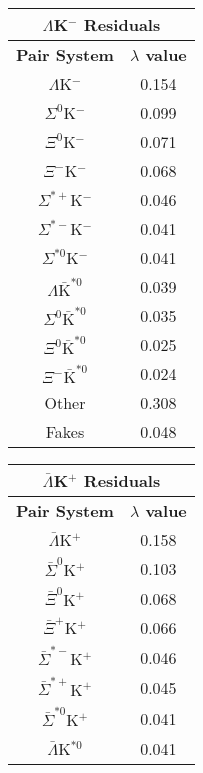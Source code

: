 \documentclass[ALICE,manyauthors]{cernphprep}
\begin{document}
\begin{table}[htbp]
 \centering
 \begin{minipage}{0.3\textwidth}
  \centering 
  \begin{tabular}{|c|c|}
   \multicolumn{2}{c}{$\Lambda$K$^{-}$ Residuals} \\
   \hline
   \textbf{Pair System} & \textbf{$\lambda$ value} \\
   \hline
   $\Lambda$K$^{-}$ & 0.154 \\
   $\Sigma^{0}$K$^{-}$ & 0.099 \\
   $\Xi^{0}$K$^{-}$ & 0.071 \\
   $\Xi^{-}$K$^{-}$ & 0.068 \\
   $\Sigma^{*+}$K$^{-}$ & 0.046 \\
   $\Sigma^{*-}$K$^{-}$ & 0.041 \\
   $\Sigma^{*0}$K$^{-}$ & 0.041 \\
   $\Lambda\bar{\mathrm{K}}^{*0}$ & 0.039 \\
   $\Sigma^{0}\bar{\mathrm{K}}^{*0}$ & 0.035 \\
   $\Xi^{0}\bar{\mathrm{K}}^{*0}$ & 0.025 \\
   $\Xi^{-}\bar{\mathrm{K}}^{*0}$ & 0.024 \\
   Other & 0.308 \\
   Fakes & 0.048 \\
   \hline
  \end{tabular}
 \end{minipage} 
 \begin{minipage}{0.3\textwidth}
  \centering 
  \begin{tabular}{|c|c|}
   \multicolumn{2}{c}{$\bar{\Lambda}$K$^{+}$ Residuals} \\
   \hline
   \textbf{Pair System} & \textbf{$\lambda$ value} \\
   \hline
   $\bar{\Lambda}$K$^{+}$ & 0.158 \\
   $\bar{\Sigma}^{0}$K$^{+}$ & 0.103 \\
   $\bar{\Xi}^{0}$K$^{+}$ & 0.068 \\
   $\bar{\Xi}^{+}$K$^{+}$ & 0.066 \\
   $\bar{\Sigma}^{*-}$K$^{+}$ & 0.046 \\
   $\bar{\Sigma}^{*+}$K$^{+}$ & 0.045 \\
   $\bar{\Sigma}^{*0}$K$^{+}$ & 0.041 \\
   $\bar{\Lambda}$K$^{*0}$ & 0.041 \\

\end{tabular}
\end{minipage}
\end{table}
\end{document}
